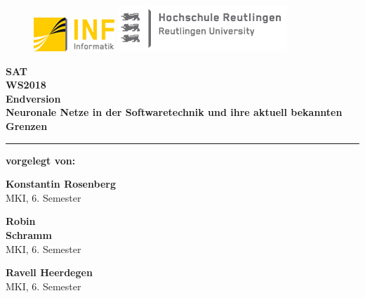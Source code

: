 \begin{titlepage}

\begin{center}

\begin{figure}
\begin{minipage}[H]{4cm}
\centering
\includegraphics[width=0.8\linewidth]{Bilder/Deckblatt/UniversityLogo.png}
\end{minipage}
\hfill
\begin{minipage}[H]{6cm}
\centering
\includegraphics[width=1\linewidth]{Bilder/Deckblatt/CompanyLogo.jpg}
\end{minipage}
\end{figure}

\vspace*{0.8cm}

\textbf{SAT} \\
\vspace*{0.2cm}
{\large \textbf{WS2018\\}}
\vspace*{0.8cm}
{\large \textbf{Endversion}}
\vspace*{0.2cm}\\
\textbf{{\large {\Large Neuronale Netze in der Softwaretechnik und ihre aktuell bekannten Grenzen }}}\\

\noindent\rule{\textwidth}{2pt}
\vspace*{0.6cm}

\textbf{vorgelegt von:\\}
\vspace*{0.2cm}
\begin{minipage}[H]{4cm}
\centering
{\large \textbf{Konstantin Rosenberg}}\\
MKI, 6. Semester
\end{minipage}
\hfill
\begin{minipage}[H]{4cm}
\centering
{\large \textbf{Robin\\ Schramm}}\\
MKI, 6. Semester
\end{minipage}
\hfill
\begin{minipage}[H]{4cm}
\centering
{\large \textbf{Ravell Heerdegen}}\\
MKI, 6. Semester
\end{minipage}


\end{center}
\end{titlepage}
